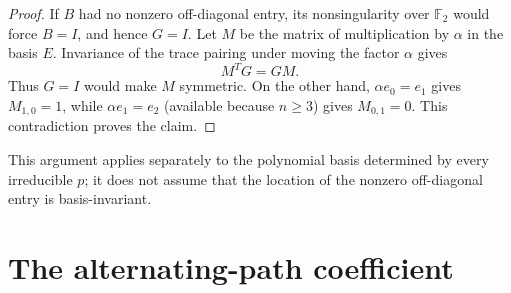 \documentclass[11pt]{article}
\newcommand{\F}{\mathbb F}
\begin{document}
\begin{proof}
If $B$ had no nonzero off-diagonal entry, its nonsingularity over $\F_2$
would force $B=I$, and hence $G=I$.  Let $M$ be the matrix of
multiplication by $\alpha$ in the basis $E$.  Invariance of the trace
pairing under moving the factor $\alpha$ gives
\[
                              M^T G=GM.                   \tag{8}
\]
Thus $G=I$ would make $M$ symmetric.  On the other hand,
$\alpha e_0=e_1$ gives $M_{1,0}=1$, while $\alpha e_1=e_2$ (available
because $n\geq3$) gives $M_{0,1}=0$.  This contradiction proves the claim.
\end{proof}

This argument applies separately to the polynomial basis determined by
every irreducible $p$; it does not assume that the location of the nonzero
off-diagonal entry is basis-invariant.

\section{The alternating-path coefficient}
\end{document}
